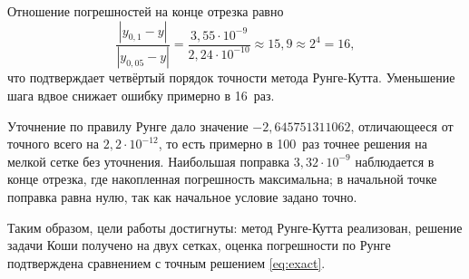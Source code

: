 \documentclass[14pt,a4paper]{extarticle}
\begin{document}
Отношение погрешностей на конце отрезка равно
\[
    \frac{|y_{0{,}1}-y|}{|y_{0{,}05}-y|}
    = \frac{3{,}55\cdot10^{-9}}{2{,}24\cdot10^{-10}}
    \approx 15{,}9 \approx 2^4 = 16,
\]
что подтверждает четвёртый порядок точности метода Рунге-Кутта.
Уменьшение шага вдвое снижает ошибку примерно в 16~раз.

Уточнение по правилу Рунге дало значение $-2{,}645751311062$, отличающееся
от точного всего на $2{,}2\cdot10^{-12}$, то есть примерно в 100~раз
точнее решения на мелкой сетке без уточнения. Наибольшая поправка
$3{,}32\cdot10^{-9}$ наблюдается в конце отрезка, где накопленная
погрешность максимальна; в начальной точке поправка равна нулю, так как
начальное условие задано точно.

Таким образом, цели работы достигнуты: метод Рунге-Кутта реализован,
решение задачи Коши получено на двух сетках, оценка погрешности по Рунге
подтверждена сравнением с точным решением \eqref{eq:exact}.
\end{document}
